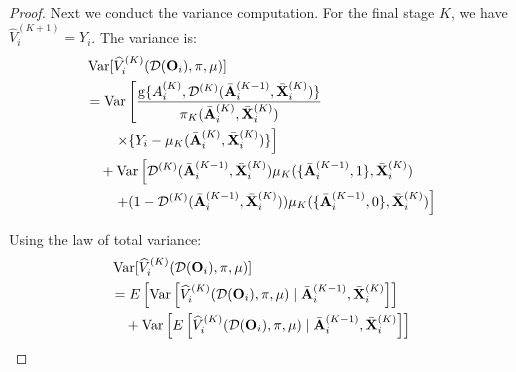 \documentclass[11pt]{article}
\theoremstyle{referenceplain}
\theoremstyle{referencedefinition}
\theoremstyle{referenceremark}
\begin{document}
\begin{proof}
Next we conduct the variance computation. For the final stage $K$, we have $\widehat{V}_i^{(K+1)} = Y_i$. The variance is:
\begin{align}
    &\operatorname{Var}[\widehat{V}_i^{(K)}(\mathcal{D}(\mathbf{O}_i),\pi,\mu)]\notag\\
    &= \operatorname{Var}\left[\frac{\mathrm{g}\{A_i^{(K)}, \mathcal{D}^{(K)}(\bar{\mathbf{A}}_i^{(K-1)},\bar{\mathbf{X}}_i^{(K)})\}}{\pi_K(\bar{\mathbf{A}}_i^{(K)}, \bar{\mathbf{X}}_i^{(K)})}\right.\notag\\
    &\quad\quad\left.\times \{Y_i - \mu_K(\bar{\mathbf{A}}_i^{(K)}, \bar{\mathbf{X}}_i^{(K)})\}\right]\notag\\
    &\quad + \operatorname{Var}\left[\mathcal{D}^{(K)}(\bar{\mathbf{A}}_i^{(K-1)},\bar{\mathbf{X}}_i^{(K)}) \mu_K(\{\bar{\mathbf{A}}_i^{(K-1)},1\}, \bar{\mathbf{X}}_i^{(K)})\right.\notag\\
    &\quad\quad\left.+ (1-\mathcal{D}^{(K)}(\bar{\mathbf{A}}_i^{(K-1)},\bar{\mathbf{X}}_i^{(K)})) \mu_K(\{\bar{\mathbf{A}}_i^{(K-1)},0\}, \bar{\mathbf{X}}_i^{(K)})\right]\label{multi-var-K-decomp}
\end{align}

Using the law of total variance:
\begin{align}
    &\operatorname{Var}[\widehat{V}_i^{(K)}(\mathcal{D}(\mathbf{O}_i),\pi,\mu)]\notag\\
    &= E\left[\operatorname{Var}\left[\widehat{V}_i^{(K)}(\mathcal{D}(\mathbf{O}_i),\pi,\mu) \mid \bar{\mathbf{A}}_i^{(K-1)}, \bar{\mathbf{X}}_i^{(K)}\right]\right]\label{multi-var-K-1}\\
    &\quad + \operatorname{Var}\left[E\left[\widehat{V}_i^{(K)}(\mathcal{D}(\mathbf{O}_i),\pi,\mu) \mid \bar{\mathbf{A}}_i^{(K-1)}, \bar{\mathbf{X}}_i^{(K)}\right]\right]\label{multi-var-K-2}
\end{align}


\end{proof}
\end{document}
